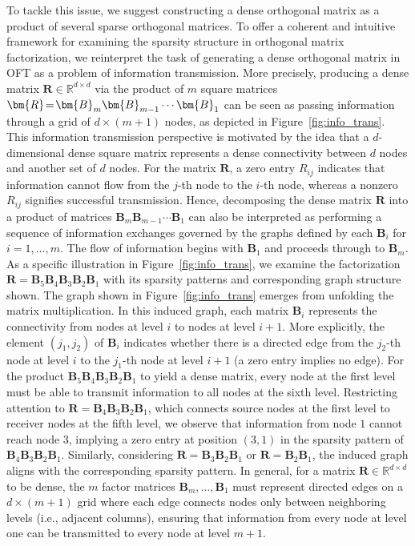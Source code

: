 To tackle this issue, we suggest constructing a dense orthogonal matrix as a product of several sparse orthogonal matrices. To offer a coherent and intuitive framework for examining the sparsity structure in orthogonal matrix factorization, we reinterpret the task of generating a dense orthogonal matrix in OFT as a problem of information transmission. More precisely, producing a dense matrix $\bm{R}\in\mathbb{R}^{d\times d}$ via the product of $m$ square matrices \(\thickmuskip=2mu \medmuskip=2mu \bm{R}=\bm{B}_m\bm{B}_{m-1}\cdots\bm{B}_1\) can be seen as passing information through a grid of $d\times (m+1)$ nodes, as depicted in Figure~\ref{fig:info_trans}. This information transmission perspective is motivated by the idea that a $d$-dimensional dense square matrix represents a dense connectivity between $d$ nodes and another set of $d$ nodes. For the matrix $\bm{R}$, a zero entry $R_{ij}$ indicates that information cannot flow from the $j$-th node to the $i$-th node, whereas a nonzero $R_{ij}$ signifies successful transmission. Hence, decomposing the dense matrix $\bm{R}$ into a product of matrices $\bm{B}_m\bm{B}_{m-1}\cdots\bm{B}_1$ can also be interpreted as performing a sequence of information exchanges governed by the graphs defined by each $\bm{B}_i$ for $i=1,\ldots,m$. The flow of information begins with $\bm{B}_1$ and proceeds through to $\bm{B}_m$. As a specific illustration in Figure~\ref{fig:info_trans}, we examine the factorization \(\bm{R}=\bm{B}_5\bm{B}_4\bm{B}_3\bm{B}_2\bm{B}_1\) with its sparsity patterns and corresponding graph structure shown. The graph shown in Figure~\ref{fig:info_trans} emerges from unfolding the matrix multiplication. In this induced graph, each matrix $\bm{B}_i$ represents the connectivity from nodes at level $i$ to nodes at level $i+1$. More explicitly, the element $(j_1,j_2)$ of $\bm{B}_i$ indicates whether there is a directed edge from the $j_2$-th node at level $i$ to the $j_1$-th node at level $i+1$ (a zero entry implies no edge). For the product $\bm{B}_5\bm{B}_4\bm{B}_3\bm{B}_2\bm{B}_1$ to yield a dense matrix, every node at the first level must be able to transmit information to all nodes at the sixth level. Restricting attention to $\bm{R}=\bm{B}_4\bm{B}_3\bm{B}_2\bm{B}_1$, which connects source nodes at the first level to receiver nodes at the fifth level, we observe that information from node $1$ cannot reach node $3$, implying a zero entry at position $(3,1)$ in the sparsity pattern of $\bm{B}_4\bm{B}_3\bm{B}_2\bm{B}_1$. Similarly, considering $\bm{R}=\bm{B}_3\bm{B}_2\bm{B}_1$ or $\bm{R}=\bm{B}_2\bm{B}_1$, the induced graph aligns with the corresponding sparsity pattern. In general, for a matrix $\bm{R}\in\mathbb{R}^{d\times d}$ to be dense, the $m$ factor matrices $\bm{B}_m,\ldots,\bm{B}_1$ must represent directed edges on a $d\times (m+1)$ grid where each edge connects nodes only between neighboring levels (i.e., adjacent columns), ensuring that information from every node at level one can be transmitted to every node at level $m+1$.

